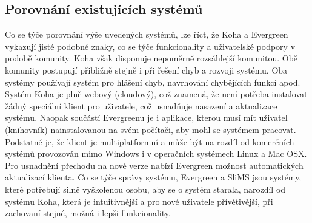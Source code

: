 \subsection{Porovnání existujících systémů}
Co se týče porovnání výše uvedených systémů, lze říct, že Koha a Evergreen
vykazují jisté podobné znaky, co se týče funkcionality a uživatelské podpory v
podobě komunity. Koha však disponuje nepoměrně rozsáhlejší komunitou. Obě
komunity postupují přibližně stejně i při řešení chyb a rozvoji systému. Oba
systémy používají systém pro hlášení chyb, navrhování chybějících funkcí apod.
Systém Koha je plně webový (cloudový), což znamená, že není potřeba instalovat
žádný speciální klient pro uživatele, což usnadňuje nasazení a aktualizace
systému. Naopak součástí Evergreenu je i aplikace, kterou musí mít uživatel
(knihovník) nainstalovanou na svém počítači, aby mohl se systémem pracovat.
Podstatné je, že klient je multiplatformní a může být na rozdíl od komerčních
systémů provozován mimo Windows i v operačních systémech Linux a Mac OSX. Pro
usnadnění přechodu na nové verze nabízí Evergreen možnost automatických
aktualizací klienta. Co se týče správy systému, Evergreen a SliMS jsou systémy,
které potřebují silně vyškolenou osobu, aby se o systém starala, narozdíl od
systému Koha, která je intuitivnější a pro nové uživatele přívětivější, při
zachovaní stejné, možná i lepši funkcionality.

